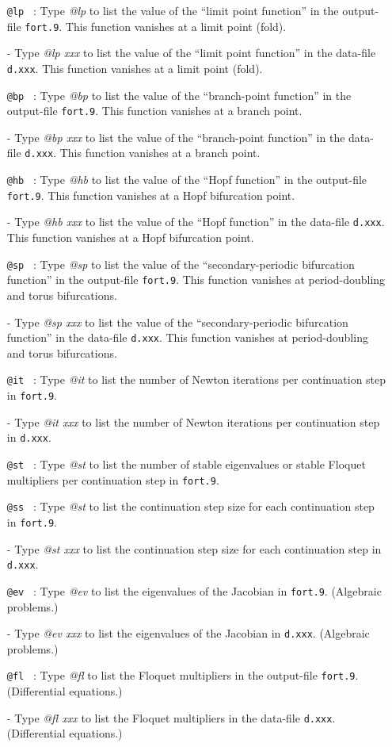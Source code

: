 \documentclass[12pt]{report}
\begin{document}
\begin{itemize}
\item[\tt @lp]~:
  Type {\it @lp} to list the value of the ``limit point function'' 
  in the output-file {\tt fort.9}. This function
  vanishes at a limit point (fold).
  \item[-]
  Type {\it @lp xxx} to list the value of the ``limit point function'' 
  in the data-file {\tt d.xxx}. This function
  vanishes at a limit point (fold).
\item[\tt @bp]~:
  Type {\it @bp} to list the value of the ``branch-point function'' 
  in the output-file {\tt fort.9}. This function
  vanishes at a branch point.
  \item[-]
  Type {\it @bp xxx} to list the value of the ``branch-point function''
  in the data-file {\tt d.xxx}. This function
  vanishes at a branch point.
\item[\tt @hb]~:
  Type {\it @hb} to list the value of the ``Hopf function'' 
  in the output-file {\tt fort.9}. This function
  vanishes at a Hopf bifurcation point.
  \item[-]
  Type {\it @hb xxx} to list the value of the ``Hopf function''
  in the data-file {\tt d.xxx}. This function
  vanishes at a  Hopf bifurcation point.
\item[\tt @sp]~:
  Type {\it @sp} to list the value of the 
  ``secondary-periodic bifurcation function'' 
  in the output-file {\tt fort.9}. This function
  vanishes at period-doubling and torus bifurcations.
  \item[-]
  Type {\it @sp xxx} to list the value of the
   ``secondary-periodic bifurcation function''
  in the data-file {\tt d.xxx}. This function
  vanishes at period-doubling and torus bifurcations.
\item[\tt @it]~:
  Type {\it @it} to list the number of Newton iterations per
  continuation step in {\tt fort.9}. 
  \item[-]
   Type {\it @it xxx} to list the number of Newton iterations per
  continuation step in {\tt d.xxx}. 
\item[\tt @st]~:
  Type {\it @st} to list the number of stable eigenvalues or stable
  Floquet multipliers per continuation step in  {\tt fort.9}. 
\item[\tt @ss]~:
  Type {\it @st} to list the continuation step size for each
  continuation step in  {\tt fort.9}. 
  \item[-]
   Type {\it @st xxx} to list the continuation step size for each
  continuation step in {\tt d.xxx}. 
\item[\tt @ev]~:
  Type {\it @ev} to list the eigenvalues of the Jacobian 
  in {\tt fort.9}. 
  (Algebraic problems.)
  \item[-]
   Type {\it @ev xxx} to list the eigenvalues of the Jacobian 
  in {\tt d.xxx}. 
  (Algebraic problems.)
\item[\tt @fl]~:
  Type {\it @fl} to list the Floquet multipliers
  in the output-file {\tt fort.9}. 
  (Differential equations.)
  \item[-]
   Type {\it @fl xxx} to list the Floquet multipliers 
  in the data-file {\tt d.xxx}. 
  (Differential equations.)
\end{itemize}
\end{document}
